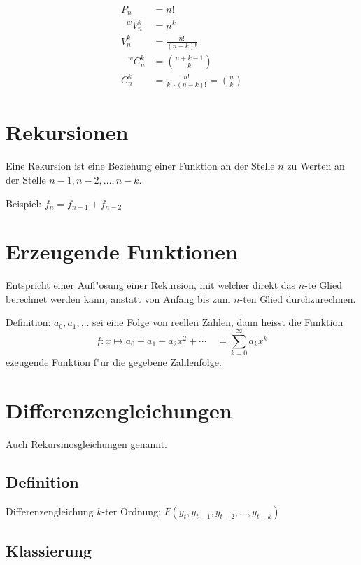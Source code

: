 \begin{align*}
	P_n &= n! \\
	\phantom{V}^wV_n^k &= n^k \\
	V_n^k &= \frac{n!}{(n-k)!} \\
	\phantom{C}^wC_n^k &= \binom{n+k-1}{k} \\
	C_n^k &= \frac{n!}{k!\cdot(n-k)!}=\binom{n}{k}
\end{align*}

\section{Rekursionen}
Eine Rekursion ist eine Beziehung einer Funktion an der Stelle $n$ zu Werten an der Stelle $n-1,n-2,\ldots,n-k$.

\noindent Beispiel: $f_n=f_{n-1}+f_{n-2}$

\section{Erzeugende Funktionen}
Entspricht einer Aufl"osung einer Rekursion, mit welcher direkt das $n$-te Glied berechnet werden kann, anstatt von Anfang bis zum $n$-ten Glied durchzurechnen.

\noindent \underline{Definition:} $a_0,a_1,\ldots$ sei eine Folge von reellen Zahlen, dann heisst die Funktion
\begin{equation*}
	f:x\mapsto a_0+a_1+a_2x^2+\cdots\quad=\sum\limits_{k=0}^\infty a_kx^k
\end{equation*}
\noindent ezeugende Funktion f"ur die gegebene Zahlenfolge.

\section{Differenzengleichungen}
Auch Rekursinosgleichungen genannt.

\subsection{Definition}
Differenzengleichung $k$-ter Ordnung: $F(y_t,y_{t-1},y_{t-2},\ldots,y_{t-k})$

\subsection{Klassierung}
\begin{center}
\end{center}

